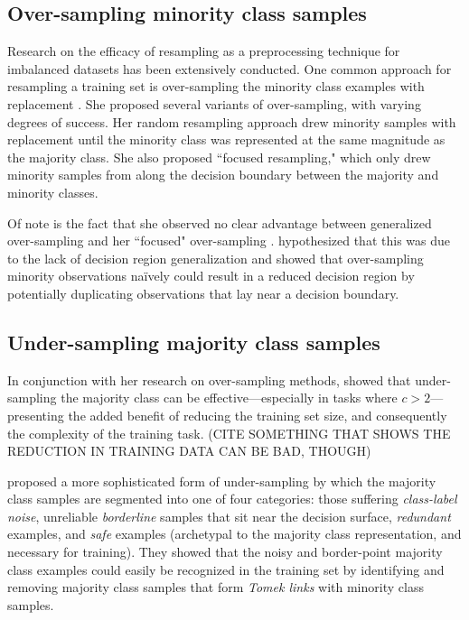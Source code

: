 \documentclass[twoside,11pt]{article}
\begin{document}
\subsection{Over-sampling minority class samples}

Research on the efficacy of resampling as a preprocessing technique for imbalanced datasets has been extensively conducted. One common approach for resampling a training set is over-sampling the minority class examples with replacement \citep{japkowicz2000class}. She proposed several variants of over-sampling, with varying degrees of success. Her random resampling approach drew minority samples with replacement until the minority class was represented at the same magnitude as the majority class. She also proposed ``focused resampling," which only drew minority samples from along the decision boundary between the majority and minority classes. 

Of note is the fact that she observed no clear advantage between generalized over-sampling and her ``focused" over-sampling \citep{japkowicz2000class}. \citet{chawla2002smote} hypothesized that this was due to the lack of decision region generalization and showed that over-sampling minority observations na\"ively could result in a reduced decision region by potentially duplicating observations that lay near a decision boundary.


\subsection{Under-sampling majority class samples}

In conjunction with her research on over-sampling methods, \citet*{japkowicz2000learning} showed that under-sampling the majority class can be effective---especially in tasks where $c > 2$---presenting the added benefit of reducing the training set size, and consequently the complexity of the training task. (CITE SOMETHING THAT SHOWS THE REDUCTION IN TRAINING DATA CAN BE BAD, THOUGH)

\citet*{kubat1997addressing} proposed a more sophisticated form of under-sampling by which the majority class samples are segmented into one of four categories: those suffering \emph{class-label noise}, unreliable \emph{borderline} samples that sit near the decision surface, \emph{redundant} examples, and \emph{safe} examples (archetypal to the majority class representation, and necessary for training). They showed that the noisy and border-point majority class examples could easily be recognized in the training set by identifying and removing majority class samples that form \emph{Tomek links} \citep{tomek1976two} with minority class samples.
\end{document}
